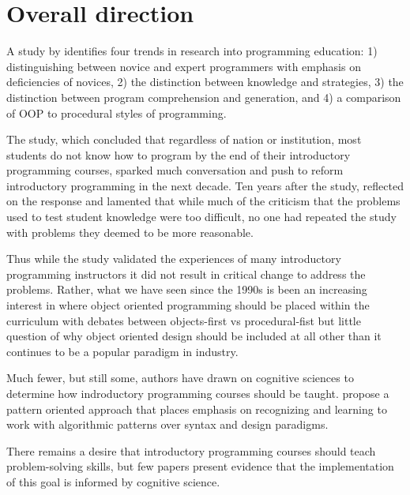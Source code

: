 \documentclass[12pt]{article}
\let\textcite=\autocite
\begin{document}
\section{Overall direction}
A \citeyear{robins_learning_2003} study by
\citeauthor{robins_learning_2003} identifies four trends in research
into programming education: 1) distinguishing between novice and
expert programmers with emphasis on deficiencies of novices, 2) the
distinction between knowledge and strategies, 3) the distinction
between program comprehension and generation, and 4) a comparison of
OOP to procedural styles of programming\autocite{robins_learning_2003}.

The \textcite{mccracken_multinational_2001} study, which concluded that
regardless of nation or institution, most students do not know how to
program by the end of their introductory programming courses, sparked
much conversation and push to reform introductory programming in the
next decade. Ten years after the
\citeauthor{mccracken_multinational_2001} study,
\textcite{lister_ten_2011} reflected on the response and lamented that
while much of the criticism that the problems used to test student
knowledge were too difficult, no one had repeated the study with
problems they deemed to be more reasonable. 

Thus while the \citeauthor{mccracken_multinational_2001} study
validated the experiences of many introductory programming instructors
it did not result in critical change to address the problems. Rather,
what we have seen since the 1990s is been an increasing interest in
where object oriented programming should be placed within the
curriculum with debates between objects-first vs procedural-fist but
little question of why object oriented design should be included at
all other than it continues to be a popular paradigm in industry.

Much fewer, but still some, authors have drawn on cognitive sciences
to determine how indroductory programming courses should be
taught. \textcite{muller_pattern_2005} propose a pattern oriented
approach that places emphasis on recognizing and learning to work with
algorithmic patterns over syntax and design paradigms.

There remains a desire that introductory programming courses should
teach problem-solving skills, but few papers present evidence that the
implementation of this goal is informed by cognitive science.
\end{document}
